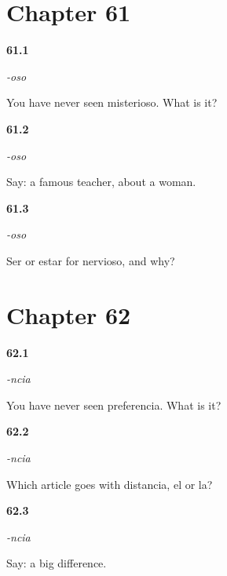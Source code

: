 \section*{Chapter 61}

\noindent\begin{minipage}[t]{\linewidth}
\raggedright
\hypertarget{review-ES-C09-oso-decode}{\textbf{61.1}} \emph{-oso}\par
\small You have never seen misterioso. What is it?
\end{minipage}\par\medskip

\noindent\begin{minipage}[t]{\linewidth}
\raggedright
\hypertarget{review-ES-C09-oso-agree}{\textbf{61.2}} \emph{-oso}\par
\small Say: a famous teacher, about a woman.
\end{minipage}\par\medskip

\noindent\begin{minipage}[t]{\linewidth}
\raggedright
\hypertarget{review-ES-C09-oso-verb}{\textbf{61.3}} \emph{-oso}\par
\small Ser or estar for nervioso, and why?
\end{minipage}\par\medskip

\section*{Chapter 62}

\noindent\begin{minipage}[t]{\linewidth}
\raggedright
\hypertarget{review-ES-C09-ncia-decode}{\textbf{62.1}} \emph{-ncia}\par
\small You have never seen preferencia. What is it?
\end{minipage}\par\medskip

\noindent\begin{minipage}[t]{\linewidth}
\raggedright
\hypertarget{review-ES-C09-ncia-article}{\textbf{62.2}} \emph{-ncia}\par
\small Which article goes with distancia, el or la?
\end{minipage}\par\medskip

\noindent\begin{minipage}[t]{\linewidth}
\raggedright
\hypertarget{review-ES-C09-ncia-build}{\textbf{62.3}} \emph{-ncia}\par
\small Say: a big difference.
\end{minipage}\par\medskip

